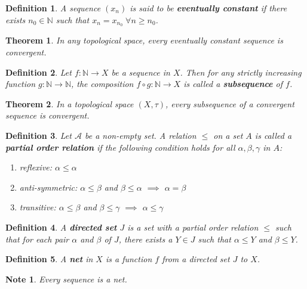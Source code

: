 \documentclass[14pt,twoside]{extreport}
\theoremstyle{dotless}
\newtheorem*{defn}{Definition}
\newtheorem*{thm}{Theorem} %
\newtheorem*{note}{Note} %
\begin{document}
\begin{defn}
    A sequence $\left (x_n\right )$ is said to be \textbf{eventually constant} if there exists $n_0 \in \mathbb{N}$ such that $x_n = x_{n_0} \;\forall n \geq n_0$.
\end{defn}

\begin{thm}
    In any topological space, every eventually constant sequence is convergent.
\end{thm}

\begin{defn}
    Let $f \colon \mathbb{N} \to X$ be a sequence in $X$. Then for any strictly increasing function $g \colon \mathbb{N} \to \mathbb{N}$, the composition $f \circ g \colon \mathbb{N} \to X$ is called a \textbf{subsequence} of $f$.
\end{defn}

\begin{thm}
    In a topological space $\left (X, \tau\right )$, every subsequence of a convergent sequence is convergent.
\end{thm}

\begin{defn}
    Let $\mathcal{A}$ be a non-empty set. A relation $\leq$ on a set $A$ is called a \textbf{partial order relation} if the following condition holds for all $\alpha, \beta, \gamma$ in $A$:
    \begin{enumerate}
        \item reflexive: $\alpha \leq \alpha$
        \item anti-symmetric: $\alpha \leq \beta$ and $\beta \leq \alpha$ $\implies$ $\alpha = \beta$
        \item transitive: $\alpha \leq \beta$ and $\beta \leq \gamma$ $\implies$ $\alpha \leq \gamma$
    \end{enumerate}
\end{defn}

\begin{defn}
    A \textbf{directed set} $J$ is a set with a partial order relation $\leq$ such that for each pair $\alpha$ and $\beta$ of $J$, there exists a $Y \in J$ such that $\alpha \leq Y$ and $\beta \leq Y$.
\end{defn}

\begin{defn}
    A \textbf{net} in $X$ is a function $f$ from a directed set $J$ to $X$.
\end{defn}

\begin{note}
Every sequence is a net.
\end{note}
\end{document}

